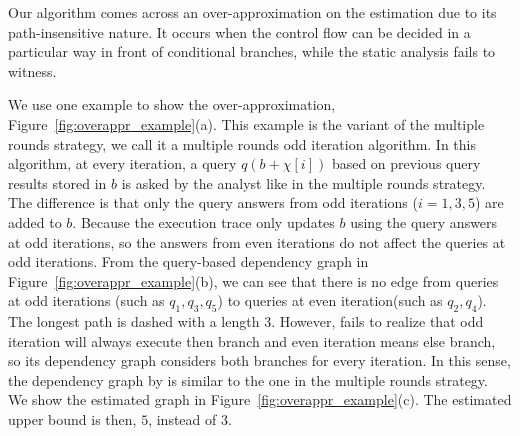 \begin{example}
Our algorithm comes across an over-approximation on the estimation due to its path-insensitive nature. It occurs when the control flow can be decided in a particular way in front of conditional branches, while the static analysis fails to witness. 

We use one example to show the over-approximation, Figure~\ref{fig:overappr_example}(a). This example is the variant of the multiple rounds strategy, 
we call it a multiple rounds odd iteration algorithm. In this algorithm, at every iteration, a query $q(b+\chi[i])$ based on previous query results stored in $b$ is asked by the analyst like in the multiple rounds strategy. The difference is that only the query answers from odd iterations ($i =1,3, 5$) are added to $b$. 
  Because the execution trace only updates $b$ using the query answers at odd iterations, so the answers from even iterations do not affect the queries at odd iterations. From the query-based dependency graph in Figure~\ref{fig:overappr_example}(b), we can see that there is no edge from queries at odd iterations (such as $q_1,q_3,q_5$) to queries at even iteration(such as $q_2,q_4$). The longest path is dashed with a length $3$.  However, {\THESYSTEM} fails to realize that odd iteration will always execute then branch and even iteration means else branch, so its dependency graph considers both branches for every iteration. In this sense, the dependency graph by {\THESYSTEM} is similar to the one in the multiple rounds strategy. We show the estimated graph in Figure~\ref{fig:overappr_example}(c). The estimated upper bound is then, $5$, instead of $3$. 
%


\end{example}
